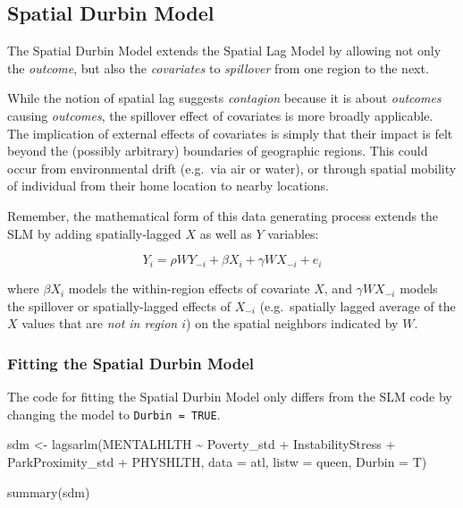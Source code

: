 \documentclass[
]{book}
\newenvironment{Shaded}{\begin{snugshade}}{\end{snugshade}}
\newcommand{\AttributeTok}[1]{\textcolor[rgb]{0.77,0.63,0.00}{#1}}
\newcommand{\FunctionTok}[1]{\textcolor[rgb]{0.00,0.00,0.00}{#1}}
\newcommand{\NormalTok}[1]{#1}
\newcommand{\OtherTok}[1]{\textcolor[rgb]{0.56,0.35,0.01}{#1}}
\newcommand{\SpecialCharTok}[1]{\textcolor[rgb]{0.00,0.00,0.00}{#1}}
\begin{document}
\hypertarget{spatial-durbin-model-1}{%
\subsection{Spatial Durbin Model}\label{spatial-durbin-model-1}}

The Spatial Durbin Model extends the Spatial Lag Model by allowing not only the \emph{outcome}, but also the \emph{covariates} to \emph{spillover} from one region to the next.

While the notion of spatial lag suggests \emph{contagion} because it is about \emph{outcomes} causing \emph{outcomes}, the spillover effect of covariates is more broadly applicable. The implication of external effects of covariates is simply that their impact is felt beyond the (possibly arbitrary) boundaries of geographic regions. This could occur from environmental drift (e.g.~via air or water), or through spatial mobility of individual from their home location to nearby locations.

Remember, the mathematical form of this data generating process extends the SLM by adding spatially-lagged \(X\) as well as \(Y\) variables:

\[Y_i=\rho WY_{-i}+\beta X_i + \gamma WX_{-i} + e_i\]

where \(\beta X_i\) models the within-region effects of covariate \(X\), and \(\gamma WX_{-i}\) models the spillover or spatially-lagged effects of \(X_{-i}\) (e.g.~spatially lagged average of the \(X\) values that are \emph{not in region \(i\)}) on the spatial neighbors indicated by \(W\).

\hypertarget{fitting-the-spatial-durbin-model}{%
\subsubsection{Fitting the Spatial Durbin Model}\label{fitting-the-spatial-durbin-model}}

The code for fitting the Spatial Durbin Model only differs from the SLM code by changing the model to \texttt{Durbin\ =\ TRUE}.

\begin{Shaded}
\begin{Highlighting}[]
\NormalTok{sdm }\OtherTok{\textless{}{-}} \FunctionTok{lagsarlm}\NormalTok{(MENTALHLTH }\SpecialCharTok{\textasciitilde{}}\NormalTok{ Poverty\_std }\SpecialCharTok{+}\NormalTok{ InstabilityStress }\SpecialCharTok{+}\NormalTok{ ParkProximity\_std  }\SpecialCharTok{+}\NormalTok{ PHYSHLTH,}
                \AttributeTok{data =}\NormalTok{ atl,}
                \AttributeTok{listw =}\NormalTok{ queen,}
                \AttributeTok{Durbin =}\NormalTok{ T)}

\FunctionTok{summary}\NormalTok{(sdm)}
\end{Highlighting}
\end{Shaded}
\end{document}
